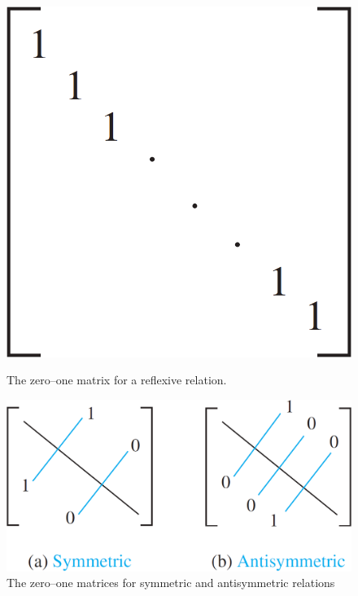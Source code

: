 \documentclass[11pt]{article}
\begin{document}
\begin{figure}[h!]
\begin{minipage}[c]{0.3\textwidth}
    \centering
    \includegraphics[width=\textwidth]{img/ch9-figure1.png}
    \caption{The zero–one matrix for a reflexive relation.}
\end{minipage}\hfill
\begin{minipage}[c]{0.63\textwidth}
    \centering
    \includegraphics[width=\textwidth]{img/ch9-figure2.png}
    \caption{The zero–one matrices for symmetric and antisymmetric relations}
\end{minipage}\hfill
\end{figure}
\end{document}
